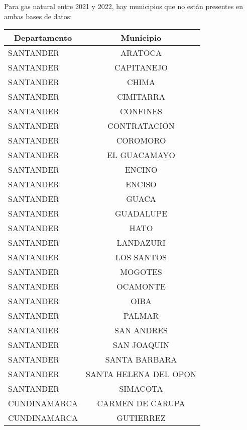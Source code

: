 \documentclass[12pt,a4paper]{article}
\begin{document}
Para gas natural entre 2021 y 2022, hay municipios que no están presentes en ambas bases de datos:

\begin{longtable}{@{}lc@{}}
	\toprule
	\multicolumn{1}{c}{\textbf{Departamento}} & \textbf{Municipio}  \\ \midrule
		SANTANDER          & ARATOCA               \\
		SANTANDER          & CAPITANEJO            \\
		SANTANDER          & CHIMA                 \\
		SANTANDER          & CIMITARRA             \\
		SANTANDER          & CONFINES              \\
		SANTANDER          & CONTRATACION          \\
		SANTANDER          & COROMORO              \\
		SANTANDER          & EL GUACAMAYO          \\
		SANTANDER          & ENCINO                \\
		SANTANDER          & ENCISO                \\
		SANTANDER          & GUACA                 \\
		SANTANDER          & GUADALUPE             \\
		SANTANDER          & HATO                  \\
		SANTANDER          & LANDAZURI             \\
		SANTANDER          & LOS SANTOS            \\
		SANTANDER          & MOGOTES               \\
		SANTANDER          & OCAMONTE              \\
		SANTANDER          & OIBA                  \\
		SANTANDER          & PALMAR                \\
		SANTANDER          & SAN ANDRES            \\
		SANTANDER          & SAN JOAQUIN           \\
		SANTANDER          & SANTA BARBARA         \\
		SANTANDER          & SANTA HELENA DEL OPON \\
		SANTANDER          & SIMACOTA              \\
		CUNDINAMARCA       & CARMEN DE CARUPA      \\
		CUNDINAMARCA       & GUTIERREZ             \\

\end{longtable}
\end{document}

